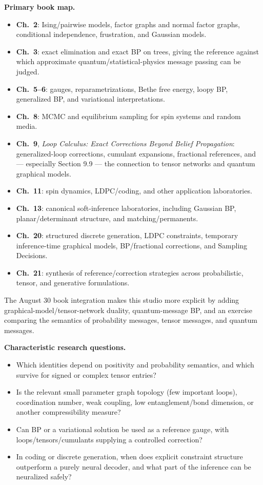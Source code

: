 \documentclass[11pt]{article}
\newcommand{\bookch}[1]{\textbf{Ch.~#1}}
\begin{document}
\textbf{Primary book map.}
\begin{itemize}
    \item \bookch{2}: Ising/pairwise models, factor graphs and normal factor graphs, conditional independence, frustration, and Gaussian models.
    \item \bookch{3}: exact elimination and exact BP on trees, giving the reference against which approximate quantum/statistical-physics message passing can be judged.
    \item \bookch{5--6}: gauges, reparametrizations, Bethe free energy, loopy BP, generalized BP, and variational interpretations.
    \item \bookch{8}: MCMC and equilibrium sampling for spin systems and random media.
    \item \bookch{9}, \emph{Loop Calculus: Exact Corrections Beyond Belief Propagation}: generalized-loop corrections, cumulant expansions, fractional references, and --- especially Section 9.9 --- the connection to tensor networks and quantum graphical models.
    \item \bookch{11}: spin dynamics, LDPC/coding, and other application laboratories.
    \item \bookch{13}: canonical soft-inference laboratories, including Gaussian BP, planar/determinant structure, and matching/permanents.
    \item \bookch{20}: structured discrete generation, LDPC constraints, temporary inference-time graphical models, BP/fractional corrections, and Sampling Decisions.
    \item \bookch{21}: synthesis of reference/correction strategies across probabilistic, tensor, and generative formulations.
\end{itemize}

The August 30 book integration makes this studio more explicit by adding graphical-model/tensor-network duality, quantum-message BP, and an exercise comparing the semantics of probability messages, tensor messages, and quantum messages.

\textbf{Characteristic research questions.}
\begin{itemize}
    \item Which identities depend on positivity and probability semantics, and which survive for signed or complex tensor entries?
    \item Is the relevant small parameter graph topology (few important loops), coordination number, weak coupling, low entanglement/bond dimension, or another compressibility measure?
    \item Can BP or a variational solution be used as a reference gauge, with loops/tensors/cumulants supplying a controlled correction?
    \item In coding or discrete generation, when does explicit constraint structure outperform a purely neural decoder, and what part of the inference can be neuralized safely?
\end{itemize}
\end{document}
